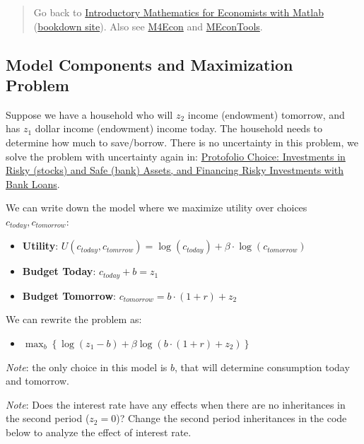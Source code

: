 \documentclass[
]{book}
\providecommand{\tightlist}{%
  \setlength{\itemsep}{0pt}\setlength{\parskip}{0pt}}
\begin{document}
\begin{quote}
Go back to \href{https://math4econ.github.io/}{Introductory Mathematics for Economists with Matlab} (\href{https://math4econ.github.io/bookdown}{bookdown site}). Also see \href{http://fanwangecon.github.io/M4Econ}{M4Econ} and \href{https://fanwangecon.github.io/MEconTools/}{MEconTools}.
\end{quote}

\hypertarget{model-components-and-maximization-problem}{%
\subsection{Model Components and Maximization Problem}\label{model-components-and-maximization-problem}}

Suppose we have a household who will \(z_2\) income (endowment) tomorrow,
and has \(z_1\) dollar income (endowment) income today. The household
needs to determine how much to save/borrow. There is no uncertainty in
this problem, we solve the problem with uncertainty again in:
\href{https://math4econ.github.io/nonlinear/RiskyAsset.html}{Protofolio Choice: Investments in Risky (stocks) and Safe (bank)
Assets, and Financing Risky Investments with Bank
Loans}.

We can write down the model where we maximize utility over choices
\(c_{today} ,c_{tomorrow}\):

\begin{itemize}
\item
  \textbf{Utility}:
  \(U(c_{today} ,c_{tomrrow} )=\log (c_{today} )+\beta \cdot \log (c_{tomorrow} )\)
\item
  \textbf{Budget Today}: \(c_{today} +b=z_1\)
\item
  \textbf{Budget Tomorrow}: \(c_{tomorrow} =b\cdot (1+r)+z_2\)
\end{itemize}

We can rewrite the problem as:

\begin{itemize}
\tightlist
\item
  \(\displaystyle \max_b \left\lbrace \log (z_1 -b)+\beta \log (b\cdot (1+r)+z_2 )\right\rbrace\)
\end{itemize}

\emph{Note}: the only choice in this model is \(b\), that will determine
consumption today and tomorrow.

\emph{Note}: Does the interest rate have any effects when there are no
inheritances in the second period (\(z_2 =0\))? Change the second period
inheritances in the code below to analyze the effect of interest rate.
\end{document}
